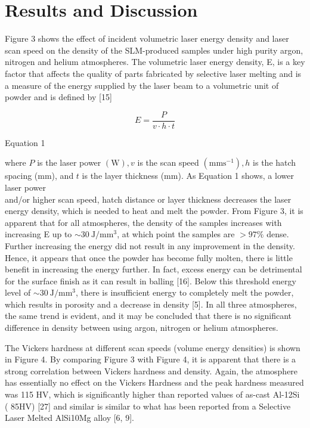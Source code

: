 \documentclass[10pt]{article}
\begin{document}
\section*{Results and Discussion}
Figure 3 shows the effect of incident volumetric laser energy density and laser scan speed on the density of the SLM-produced samples under high purity argon, nitrogen and helium atmospheres. The volumetric laser energy density, E, is a key factor that affects the quality of parts fabricated by selective laser melting and is a measure of the energy supplied by the laser beam to a volumetric unit of powder and is defined by [15]

$$
E=\frac{P}{v \cdot h \cdot t}
$$

Equation 1

where $P$ is the laser power $(\mathrm{W}), v$ is the scan speed $\left(\mathrm{mm} \mathrm{s}^{-1}\right), h$ is the hatch spacing (mm), and $t$ is the layer thickness (mm). As Equation 1 shows, a lower laser power\\
and/or higher scan speed, hatch distance or layer thickness decreases the laser energy density, which is needed to heat and melt the powder. From Figure 3, it is apparent that for all atmospheres, the density of the samples increases with increasing E up to $\sim 30 \mathrm{~J} / \mathrm{mm}^{3}$, at which point the samples are $>97 \%$ dense. Further increasing the energy did not result in any improvement in the density. Hence, it appears that once the powder has become fully molten, there is little benefit in increasing the energy further. In fact, excess energy can be detrimental for the surface finish as it can result in balling [16]. Below this threshold energy level of $\sim 30 \mathrm{~J} / \mathrm{mm}^{3}$, there is insufficient energy to completely melt the powder, which results in porosity and a decrease in density [5]. In all three atmospheres, the same trend is evident, and it may be concluded that there is no significant difference in density between using argon, nitrogen or helium atmospheres.

The Vickers hardness at different scan speeds (volume energy densities) is shown in Figure 4. By comparing Figure 3 with Figure 4, it is apparent that there is a strong correlation between Vickers hardness and density. Again, the atmosphere has essentially no effect on the Vickers Hardness and the peak hardness measured was 115 HV, which is significantly higher than reported values of as-cast Al-12Si ( 85HV) [27] and similar is similar to what has been reported from a Selective Laser Melted AlSi10Mg alloy [6, 9].
\end{document}
